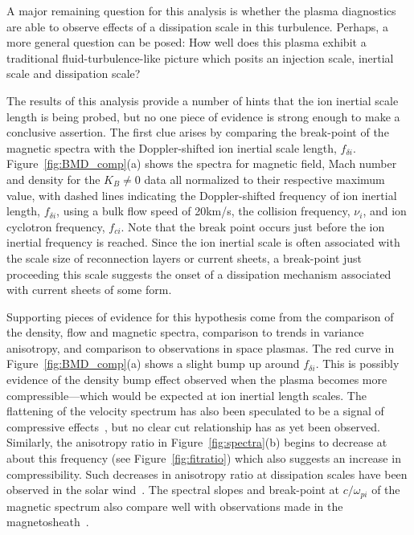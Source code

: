 \documentclass[aip,prl,amsmath,amssymb,reprint,superscriptaddress]{revtex4-1} %
\begin{document}
A major remaining question for this analysis is whether the plasma diagnostics are able to observe effects of a dissipation scale in this turbulence. Perhaps, a more general question can be posed: How well does this plasma exhibit a traditional fluid-turbulence-like picture which posits an injection scale, inertial scale and dissipation scale?

The results of this analysis provide a number of hints that the ion inertial scale length is being probed, but no one piece of evidence is strong enough to make a conclusive assertion. The first clue arises by comparing the break-point of the magnetic spectra with the Doppler-shifted ion inertial scale length, $f_{\delta i}$. Figure~\ref{fig:BMD_comp}(a) shows the spectra for magnetic field, Mach number and density for the $K_{B}\neq 0$ data all normalized to their respective maximum value, with dashed lines indicating the Doppler-shifted frequency of ion inertial length, $f_{\delta i}$, using a bulk flow speed of 20km/s, the collision frequency, $\nu_{i}$, and ion cyclotron frequency, $f_{ci}$. Note that the break point occurs just before the ion inertial frequency is reached. Since the ion inertial scale is often associated with the scale size of reconnection layers or current sheets, a break-point just proceeding this scale suggests the onset of a dissipation mechanism associated with current sheets of some form.

Supporting pieces of evidence for this hypothesis come from the comparison of the density, flow and magnetic spectra, comparison to trends in variance anisotropy, and comparison to observations in space plasmas. The red curve in Figure~\ref{fig:BMD_comp}(a) shows a slight bump up around $f_{\delta i}$. This is possibly evidence of the density bump effect observed when the plasma becomes more compressible---which would be expected at ion inertial length scales. The flattening of the velocity spectrum has also been speculated to be a signal of compressive effects~\cite{roberts10}, but no clear cut relationship has as yet been observed. Similarly, the anisotropy ratio in Figure~\ref{fig:spectra}(b) begins to decrease at about this frequency (see Figure~\ref{fig:fitratio}) which also suggests an increase in compressibility. Such decreases in anisotropy ratio at dissipation scales have been observed in the solar wind~\cite{hamilton08,kiyani13}. The spectral slopes and break-point at $c/\omega_{pi}$ of the magnetic spectrum also compare well with observations made in the magnetosheath~\cite{yordanova08}.
\end{document}
